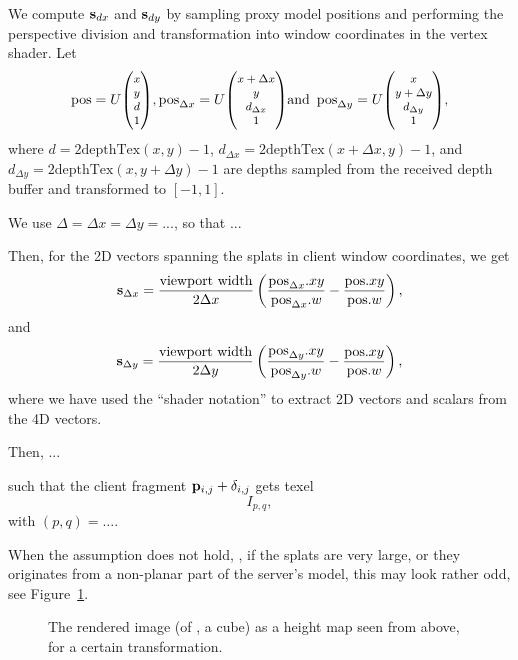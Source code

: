 We compute $\mathbf{s}_{dx}$ and $\mathbf{s}_{dy}$ by sampling proxy model positions and
performing the perspective division and transformation into window coordinates
in the vertex shader.
Let
\[
  \text{pos} =
  U { \small \begin{pmatrix} x \\ y \\ d \\ 1 \end{pmatrix} },
  \text{pos}_{\Delta x} =
  U { \small \begin{pmatrix} x+\Delta x \\ y \\ d_{\Delta x} \\ 1 \end{pmatrix} }
  \text{and}\, \, \, 
  \text{pos}_{\Delta y} =
  U { \small \begin{pmatrix} x \\ y+\Delta y \\ d_{\Delta y} \\ 1 \end{pmatrix} },
\]
where $d = 2\text{depthTex}(x, y) - 1$, $d_{\Delta x} =
2\text{depthTex}(x+\Delta x, y) - 1$, and $d_{\Delta y} = 2\text{depthTex}(x,
y+\Delta y) - 1$ are depths sampled from the received depth buffer and transformed
to $[-1, 1]$. 

We use $\Delta = \Delta x = \Delta y = ...$, so that ...

Then, for the 2D vectors spanning the splats in client window coordinates, we
get
\[
  \mathbf{s}_{\Delta x} =
    \frac{\text{viewport width}}{2\Delta x} \left(
        \frac{\text{pos}_{\Delta x}.xy}{\text{pos}_{\Delta x}.w} -
        \frac{\text{pos}.xy}{\text{pos}.w}
    \right),
\]
and
\[
  \mathbf{s}_{\Delta y} =
    \frac{\text{viewport width}}{2\Delta y} \left(
        \frac{\text{pos}_{\Delta y}.xy}{\text{pos}_{\Delta y}.w} -
        \frac{\text{pos}.xy}{\text{pos}.w}
    \right),
\]
where we have used the ``shader notation'' to extract 2D vectors and scalars
from the 4D vectors.

Then, ...

such that the client fragment $\mathbf{p}_{i, j} + \delta_{i, j}$ gets texel
\[
  I_{p, q},
\]
with $(p, q) = \ldots$.

When the assumption does not hold, \eg, if the splats are very large, or they
originates from a non-planar part of the server's model, this may look rather
odd, see Figure~\ref{fig:LargeSplatsOnCorners}.

\begin{figure}[htb]
  \centering
  \caption{\label{fig:LargeSplatsOnCorners}
           The rendered image (of \eg, a cube) as a height map seen from above,
           for a certain transformation.}
\end{figure}

